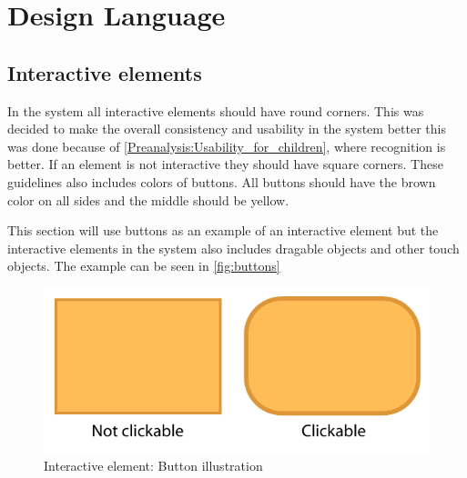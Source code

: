 \section{Design Language}
\label{design:design_language}

\subsection{Interactive elements}
\label{design:button_design}

In the \giraf[] system all interactive elements should have round corners. This was decided to make the overall consistency and usability in the \giraf[] system better this was done because of \autoref{Preanalysis:Usability_for_children}, where recognition is better.
If an element is not interactive they should have square corners.
These guidelines also includes colors of buttons. All buttons should have the brown color on all sides and the middle should be yellow.

This section will use buttons as an example of an interactive element but the interactive elements in the \giraf[] system also includes dragable objects and other touch objects. The example can be seen in \autoref{fig:buttons}

\begin{figure}[h!]
	\centering
	\includegraphics[scale=0.6]{gfx/buttons.pdf}
	\caption{Interactive element: Button illustration}
	\label{fig:buttons}
\end{figure}